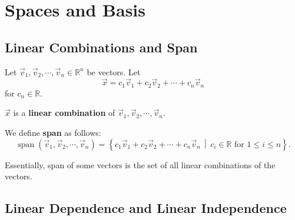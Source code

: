 \documentclass[]{book}
\DeclareMathOperator{\vecspan}{span}
\newcommand{\suchthat}{\,\middle|\,}
\begin{document}
\tableofcontents
\renewcommand{\listtheoremname}{List of Theorems}
\listoftheorems[ignoreall,show={theorem}]

\renewcommand{\listtheoremname}{List of Definitions}
\listoftheorems[ignoreall,show={definition}]
\chapter{Spaces and Basis}

\section{Linear Combinations and Span}
Let $\vec{v}_1,\vec{v}_2,\cdots,\vec{v}_n \in \mathbb{R}^n$ be vectors. Let
\[\vec{x} = c_1\vec{v}_1 + c_2\vec{v}_2 + \cdots + c_n\vec{v}_n\] for $c_n \in \mathbb{R}$.
\begin{definition}
    $\vec{x}$ is a \textbf{linear combination} of $\vec{v}_1,\vec{v}_2,\cdots,\vec{v}_n$.
\end{definition}
\begin{definition}[span] We define \textbf{span} as follows: 
    \[\vecspan(\vec{v}_1, \vec{v}_2, \cdots, \vec{v}_n) = \left\{c_1\vec{v}_1 + c_2\vec{v}_2 + \cdots + c_n\vec{v}_n \suchthat c_i \in \mathbb{R} \text{ for } 1 \leq i \leq n \right\}.\]

    Essentially, span of some vectors is the set of all linear combinations of the vectors.
\end{definition}

\section{Linear Dependence and Linear Independence}
\end{document}
